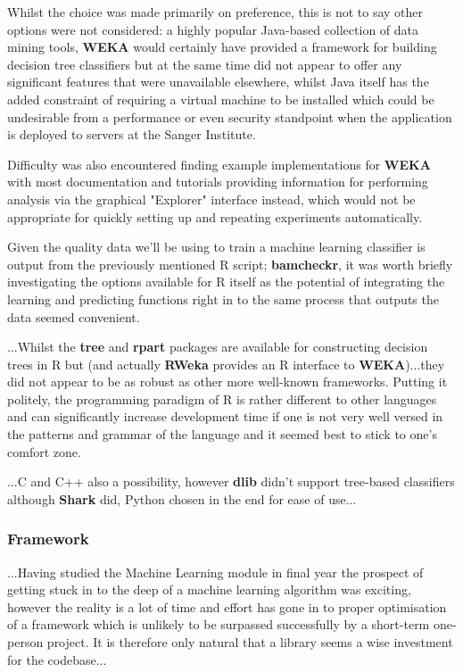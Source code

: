 Whilst the choice was made primarily on preference, this is not to say other
options were not considered: a highly popular Java-based collection of data
mining tools, \textbf{WEKA} would certainly have provided a framework for
building decision tree classifiers but at the same time did not appear to offer
any significant features that were unavailable elsewhere, whilst Java itself has
the added constraint of requiring a virtual machine to be installed which could
be undesirable from a performance or even security standpoint when the
application is deployed to servers at the Sanger Institute.


Difficulty was also encountered finding example implementations for \textbf{WEKA}
with most documentation and tutorials providing information for performing
analysis via the graphical "Explorer" interface instead, which would not be
appropriate for quickly setting up and repeating experiments automatically.

Given the quality data we'll be using to train a machine learning classifier is
output from the previously mentioned R script; \textbf{bamcheckr}, it was worth
briefly investigating the options available for R itself as the potential of
integrating the learning and predicting functions right in to the same process
that outputs the data seemed convenient.

...Whilst the \textbf{tree} and \textbf{rpart} packages are available for
constructing decision trees in R but (and actually \textbf{RWeka} provides an R
interface to \textbf{WEKA})...they did not appear to be as robust as
other more well-known frameworks. Putting it politely, the programming paradigm
of R is rather different to other languages and can significantly increase
development time if one is not very well versed in the patterns and grammar of
the language and it seemed best to stick to one's comfort zone.

...C and C++ also a possibility, however \textbf{dlib} didn't support tree-based
classifiers although \textbf{Shark} did, Python chosen in the end for ease of
use...


\subsubsection{Framework}
...Having studied the Machine Learning module in final year the prospect of
getting stuck in to the deep of a machine learning algorithm was exciting,
however the reality is a lot of time and effort has gone in to proper
optimisation of a framework which is unlikely to be surpassed successfully by a
short-term one-person project. It is therefore only natural that a library seems
a wise investment for the codebase...

